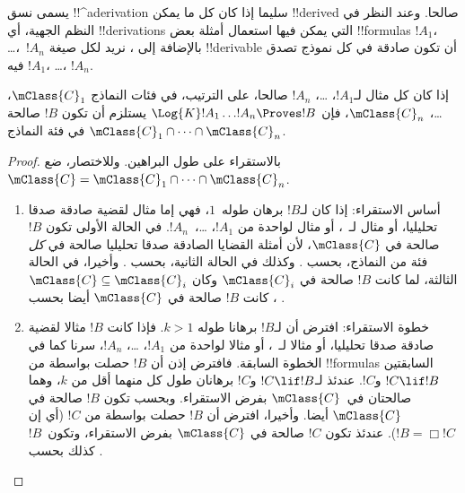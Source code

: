 \documentclass[../../../include/open-logic-section]{subfiles}
\begin{document}


يسمى نسق !!^a{derivation} سليما إذا كان كل ما يمكن !!{derive}d
صالحا. وعند النظر في النظم الجهية، أي !!{derivation}s التي يمكن فيها
استعمال أمثلة بعض !!{formula}s $!A_1$، \dots،~$!A_n$ بالإضافة إلى
، نريد لكل صيغة !!{derivable} أن تكون صادقة في كل نموذج تصدق
فيه $!A_1$، \dots، $!A_n$.

\begin{thm}
  إذا كان كل مثال لـ$!A_1$، \dots، $!A_n$ صالحا، على الترتيب، في
  فئات النماذج $\mClass{C}_1$، \dots، $\mClass{C}_n$، فإن
  $\Log{K}!A_1\dots !A_n \Proves !B$ يستلزم أن تكون $!B$ صالحة في
  فئة النماذج $\mClass{C}_1 \cap \dots \cap \mClass{C}_n$.
\end{thm}

\begin{proof}
  بالاستقراء على طول البراهين. وللاختصار، ضع $\mClass{C} =
  \mClass{C}_1 \cap \dots \cap \mClass{C}_n$.
  \begin{enumerate}
  \item أساس الاستقراء: إذا كان لـ$!B$ برهان طوله~$1$، فهي إما مثال
    لقضية صادقة صدقا تحليليا، أو مثال لـ~،
     أو مثال لواحدة من $!A_1$،
    \dots،~$!A_n$. في الحالة الأولى تكون $!B$ صالحة في
    $\mClass{C}$، لأن أمثلة القضايا الصادقة صدقا تحليليا صالحة في
    \emph{كل} فئة من النماذج، بحسب .
    وكذلك في الحالة الثانية، بحسب
    . وأخيرا، في الحالة الثالثة،
    لما كانت $!B$ صالحة في $\mClass{C}_i$ وكان $\mClass{C} \subseteq
    \mClass{C}_i$، كانت $!B$ صالحة في $\mClass{C}$ أيضا بحسب
    .
  \item خطوة الاستقراء: افترض أن لـ$!B$ برهانا طوله $k>1$. فإذا كانت
    $!B$ مثالا لقضية صادقة صدقا تحليليا، أو مثالا لـ~،
     أو مثالا لواحدة من
    $!A_1$، \dots، $!A_n$، سرنا كما في الخطوة السابقة. فافترض إذن أن
    $!B$ حصلت بواسطة \MP{} من !!{formula}s السابقتين $!C \lif !B$
    و$!C$. عندئذ لـ$!C \lif !B$ و$!C$ برهانان طول كل منهما أقل من
    $k$، وهما صالحتان في~$\mClass{C}$ بفرض الاستقراء. وبحسب
     تكون $!B$ صالحة في $\mClass{C}$
    أيضا. وأخيرا، افترض أن $!B$ حصلت بواسطة \Nec{} من $!C$ (أي إن
    $!B = \Box!C$). عندئذ تكون $!C$ صالحة في $\mClass{C}$ بفرض
    الاستقراء، وتكون~$!B$ كذلك بحسب .
  \end{enumerate}
\end{proof}
\end{document}
